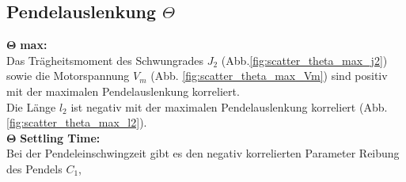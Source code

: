 \subsection*{Pendelauslenkung $\Theta$}
$\bm{\Theta}$ \textbf{max: }\\
Das Trägheitsmoment des Schwungrades $J_2$ (Abb.\ref{fig:scatter_theta_max_j2}) sowie die Motorspannung $V_m$ (Abb. \ref{fig:scatter_theta_max_Vm}) sind positiv mit der maximalen Pendelauslenkung korreliert.\\
Die Länge $l_2$ ist negativ mit der maximalen Pendelauslenkung korreliert (Abb. \ref{fig:scatter_theta_max_l2}).\\
$\bm{\Theta}$ \textbf{Settling Time: }\\
Bei der Pendeleinschwingzeit gibt es den negativ korrelierten Parameter \glqq Reibung des Pendels $C_1$\grqq{},
